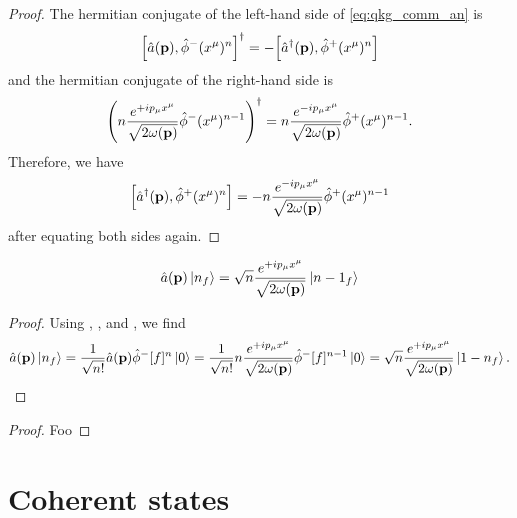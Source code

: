 \begin{proof}
	The hermitian conjugate of the left-hand side of \cref{eq:qkg_comm_an} is
	\begin{equation*}
		\comm{\hat{a}(\vb{p})}{\hat\phi^-(x^\mu)^n}^\dagger
		=
		-
		\comm{\hat{a}^\dagger(\vb{p})}{\hat\phi^+(x^\mu)^n}
	\end{equation*}
	and the hermitian conjugate of the right-hand side is
	\begin{equation*}
		\left(
			n
			\frac{e^{+ip_\mu x^\mu}}{\sqrt{2\omega(\vb{p})}}
			\hat\phi^-(x^\mu)^{n-1}
		\right)^\dagger
		=
		n
		\frac{e^{-ip_\mu x^\mu}}{\sqrt{2\omega(\vb{p})}}
		\hat\phi^+(x^\mu)^{n-1}
		.
	\end{equation*}
	Therefore, we have
	\begin{equation*}
		\comm{\hat{a}^\dagger(\vb{p})}{\hat\phi^+(x^\mu)^n}
		=
		-
		n
		\frac{e^{-ip_\mu x^\mu}}{\sqrt{2\omega(\vb{p})}}
		\hat\phi^+(x^\mu)^{n-1}
	\end{equation*}
	after equating both sides again.
\end{proof}
\begin{lemma}
	\begin{equation}
		\hat{a}(\vb{p})
		\ket{n_f}
		=
		\sqrt{n}
		\frac{e^{+ip_\mu x^\mu}}{\sqrt{2\omega(\vb{p})}}
		\ket{n-1_f}
	\end{equation}
\end{lemma}
\begin{proof}
	Using , , and , we find
	\begin{equation*}
		\begin{split}
			\hat{a}(\vb{p})
			\ket{n_f}
			=
			\frac{1}{\sqrt{n!}}
			\hat{a}(\vb{p})
			\hat\phi^-[f]^n
			\ket{0}
			=
			\frac{1}{\sqrt{n!}}
			n
			\frac{e^{+ip_\mu x^\mu}}{\sqrt{2\omega(\vb{p})}}
			\hat\phi^-[f]^{n-1}
			\ket{0}
			=
			\sqrt{n}
			\frac{e^{+ip_\mu x^\mu}}{\sqrt{2\omega(\vb{p})}}
			\ket{1-n_f}
			.
		\end{split}
	\end{equation*}
\end{proof}

\qkgnumbereigenstate
\begin{proof}
Foo	
\end{proof}

\section{Coherent states}